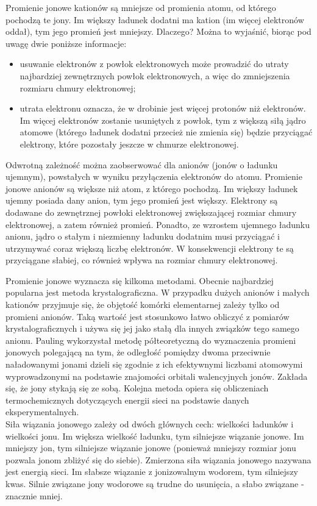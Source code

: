 \documentclass{article}
\begin{document}
Promienie jonowe kationów są mniejsze od promienia atomu, od którego pochodzą te jony. Im większy ładunek dodatni ma kation (im więcej elektronów oddał), tym jego promień jest mniejszy. Dlaczego? Można to wyjaśnić, biorąc pod uwagę dwie poniższe informacje:
\begin{itemize}
\item usuwanie elektronów z powłok elektronowych może prowadzić do utraty najbardziej zewnętrznych powłok elektronowych, a więc do zmniejszenia rozmiaru chmury elektronowej;
\item utrata elektronu oznacza, że w drobinie jest więcej protonów niż elektronów. Im więcej elektronów zostanie usuniętych z powłok, tym z większą siłą jądro atomowe (którego ładunek dodatni przecież nie zmienia się) będzie przyciągać elektrony, które pozostały
jeszcze w chmurze elektronowej.
\end{itemize}

Odwrotną zależność można zaobserwować dla anionów (jonów o ładunku ujemnym),
powstałych w wyniku przyłączenia elektronów do atomu. Promienie jonowe anionów są
większe niż atom, z którego pochodzą. Im większy ładunek ujemny posiada dany anion, tym
jego promień jest większy. Elektrony są dodawane do zewnętrznej powłoki elektronowej
zwiększającej rozmiar chmury elektronowej, a zatem również promień. Ponadto, ze
wzrostem ujemnego ładunku anionu, jądro o stałym i niezmienny ładunku dodatnim musi
przyciągać i utrzymywać coraz większą liczbę elektronów. W konsekwencji elektrony te są
przyciągane słabiej, co również wpływa na rozmiar chmury elektronowej.


Promienie jonowe wyznacza się kilkoma metodami. Obecnie najbardziej popularna jest metoda krystalograficzna. W przypadku dużych anionów i małych kationów przyjmuje się, że objętość komórki elementarnej zależy tylko od promieni anionów. Taką wartość jest stosunkowo łatwo obliczyć z pomiarów krystalograficznych i używa się jej jako stałą dla innych związków tego samego anionu. Pauling wykorzystał metodę półteoretyczną do wyznaczenia promieni jonowych polegającą na tym, że odległość pomiędzy dwoma przeciwnie naładowanymi jonami dzieli się zgodnie z ich efektywnymi liczbami atomowymi wyprowadzonymi na podstawie znajomości orbitali walencyjnych jonów. Zakłada się, że jony stykają się ze sobą.  Kolejna metoda opiera się obliczeniach termochemicznych dotyczących energii sieci na podstawie danych eksperymentalnych.\\

Siła wiązania jonowego zależy od dwóch głównych cech: wielkości ładunków i wielkości jonu. Im większa wielkość ładunku, tym silniejsze wiązanie jonowe. Im mniejszy jon, tym silniejsze wiązanie jonowe (ponieważ mniejszy rozmiar jonu pozwala jonom zbliżyć się do siebie). Zmierzona siła wiązania jonowego nazywana jest energią sieci. Im słabsze wiązanie z jonizowalnym wodorem, tym silniejszy kwas. Silnie związane jony wodorowe są trudne do usunięcia, a słabo związane - znacznie mniej.
\end{document}
